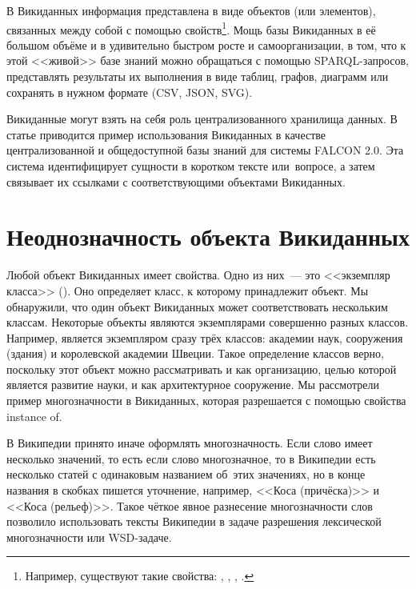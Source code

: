 В Викиданных информация представлена в виде объектов (или элементов), 
связанных между собой с помощью свойств\footnote{%
%
Например, существуют такие свойства: , 
, \mbox{}, .%
%
}. Мощь базы Викиданных в её большом объёме и в удивительно быстром росте и самоорганизации, 
в том, что к этой <<живой>> базе знаний можно обращаться с помощью  SPARQL-запросов, 
представлять результаты их выполнения в виде таблиц, графов, диаграмм или сохранять в нужном формате (CSV, JSON, SVG).

Викиданные могут взять на себя роль централизованного хранилища данных. В статье\autocite{Falcon_2.0} приводится пример использования Викиданных в качестве централизованной и общедоступной базы знаний для системы FALCON 2.0. Эта система идентифицирует сущности в коротком тексте или~вопросе, а затем связывает их ссылками с соответствующими объектами Викиданных.



\section{Неоднозначность объекта Викиданных}

Любой объект Викиданных имеет свойства. Одно из них~--- это <<экземпляр класса>> 
(). Оно определяет класс, к которому принадлежит объект. 
Мы обнаружили, что один объект Викиданных может соответствовать нескольким классам.
Некоторые объекты являются экземплярами совершенно разных классов. 
Например,  является экземпляром 
сразу трёх классов: академии наук, сооружения (здания) и королевской академии Швеции. 
Такое определение классов верно, поскольку этот объект можно рассматривать 
и как организацию, целью которой является развитие науки, и как архитектурное сооружение. 
Мы рассмотрели пример многозначности в Викиданных, которая разрешается с помощью свойства instance of.

В Википедии принято иначе оформлять многозначность. 
Если слово имеет несколько значений, то есть если слово многозначное, 
то в Википедии есть несколько статей с одинаковым названием об~этих значениях, 
но в конце названия в скобках пишется уточнение, 
например, <<Коса (причёска)>> и <<Коса (рельеф)>>. 
Такое чёткое явное разнесение многозначности слов позволило использовать тексты Википедии 
в задаче разрешения лексической многозначности или WSD-задаче\autocite{Fogarolli}.




